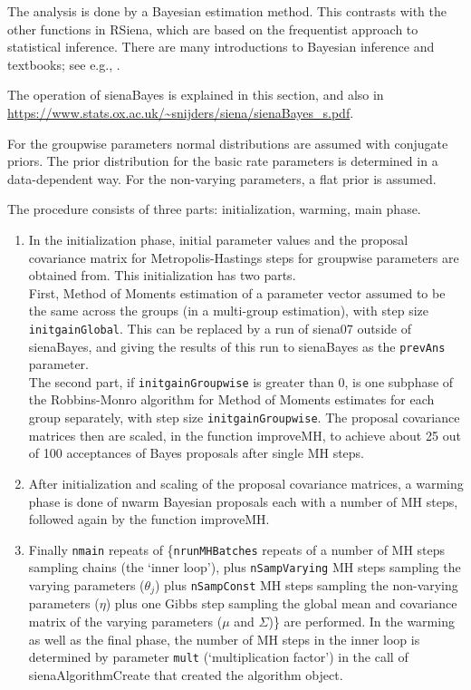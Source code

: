 \documentclass[a4paper,fleqn,11pt]{article}
\newcommand{\+}{\, + \,}
\newcommand{\sfn}[1]{\textsf{#1}}
\newcommand{\rs}{{\sf RSiena}}
\begin{document}
  The analysis is done by a Bayesian estimation method.
  This contrasts with the other functions in \rs, which are based on the
  frequentist approach to statistical inference.
  There are many introductions to Bayesian inference and textbooks; see e.g.,
  \citet{KaplanDepaoli2013,Gill2015,DonovanMickey2019}.
  \medskip

  The operation of \sfn{sienaBayes} is explained in this section,
  and also in \url{https://www.stats.ox.ac.uk/~snijders/siena/sienaBayes_s.pdf}.

  For the groupwise parameters normal distributions are assumed with conjugate
  priors. The prior distribution for the basic rate parameters is determined
  in a data-dependent way. For the non-varying parameters,
  a flat prior is assumed.

  The procedure consists of three parts: initialization, warming,
  main phase.
  \begin{enumerate}
  \item
  In the initialization phase, initial parameter values and the proposal
  covariance matrix for Metropolis-Hastings steps for groupwise parameters
  are obtained from.
  This initialization has two parts.\\
  First, Method of Moments estimation of a parameter vector
  assumed to be the same across the groups (in a multi-group estimation),
  with step size \texttt{initgainGlobal}.
  This can be replaced by a run of \sfn{siena07} outside of \sfn{sienaBayes},
  and giving the results of this run to \sfn{sienaBayes}
  as the \texttt{prevAns} parameter.\\
  The second part, if \texttt{initgainGroupwise} is greater than 0,
  is one subphase of the Robbins-Monro algorithm for Method of
  Moments estimates for each group separately, with step size
  \texttt{initgainGroupwise}.
  The proposal covariance matrices then are scaled, in the
  function \sfn{improveMH}, to achieve about 25 out of 100 acceptances of
  Bayes proposals after single MH steps.
  \item
  After initialization and scaling of the proposal covariance matrices,
  a warming phase is done of \sfn{nwarm} Bayesian proposals
  each with a number of MH steps, followed again by the function \sfn{improveMH}.
  \item
  Finally \texttt{nmain} repeats of \Big\{\texttt{nrunMHBatches} repeats of a
  number of MH steps sampling chains (the `inner loop'),
  plus \texttt{nSampVarying} MH steps
  sampling the varying parameters ($\theta_j$) plus \texttt{nSampConst} MH steps
  sampling the non-varying parameters ($\eta$) plus one Gibbs
  step sampling the global mean and covariance matrix of the varying parameters
  ($\mu$ and $\Sigma$)\Big\} are performed.
  In the warming as well as the final phase,
  the number of MH steps in the inner loop is
  determined by parameter \texttt{mult} (`multiplication factor')
  in the call of \sfn{sienaAlgorithmCreate} that created the algorithm object.
\end{enumerate}
\end{document}
